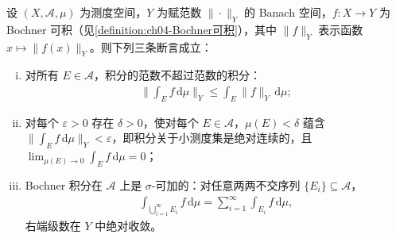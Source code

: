 \documentclass[../../main.tex]{subfiles}%
\begin{document}
\begin{proposition}\label{proposition:ch04-Bochner性质}
设 $(X,\mathcal{A},\mu)$ 为测度空间，$Y$ 为赋范数 $\|\cdot\|_Y$ 的 Banach 空间，$f:X\to Y$ 为 Bochner 可积（见\cref{definition:ch04-Bochner可积}），其中 $\|f\|_Y$ 表示函数 $x\mapsto\|f(x)\|_Y$。则下列三条断言成立：
\begin{enumerate}[(i)]
\item\label{item:ch04-Bochner性质-i} 对所有 $E\in\mathcal{A}$，积分的范数不超过范数的积分：
\begin{align}
\Big\|\int_E f\,\mathrm{d}\mu\Big\|_Y\leqslant\int_E\|f\|_Y\,\mathrm{d}\mu; \label{align:ch04-4.38}
\end{align}
\item\label{item:ch04-Bochner性质-ii} 对每个 $\varepsilon>0$ 存在 $\delta>0$，使对每个 $E\in\mathcal{A}$，$\mu(E)<\delta$ 蕴含 $\|\int_E f\,\mathrm{d}\mu\|_Y<\varepsilon$，即积分关于小测度集是绝对连续的，且 $\lim_{\mu(E)\to0}\int_E f\,\mathrm{d}\mu=0$；
\item\label{item:ch04-Bochner性质-iii} Bochner 积分在 $\mathcal{A}$ 上是 $\sigma$-可加的：对任意两两不交序列 $\{E_i\}\subseteq\mathcal{A}$，
\begin{align}
\int_{\bigcup_{i=1}^\infty E_i}f\,\mathrm{d}\mu=\sum_{i=1}^\infty\int_{E_i}f\,\mathrm{d}\mu, \label{align:ch04-4.39}
\end{align}
右端级数在 $Y$ 中绝对收敛。
\end{enumerate}
\end{proposition}
\end{document}
